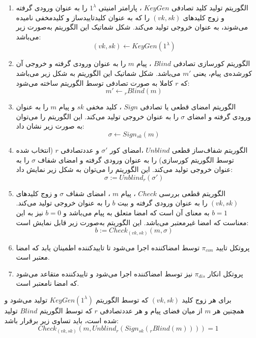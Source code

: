 \documentclass[12pt,a4paper]{article}
\theoremstyle{plain}
\theoremstyle{definition}
\theoremstyle{remark}
\begin{document}
\begin{enumerate}
	\item 
الگوریتم تولید کلید تصادفی 
$KeyGen$
، پارامتر امنیتی
$1^\lambda$
را به عنوان ورودی گرفته و زوج کلیدهای
$(vk,sk)$
را که به عنوان کلیدتاییدساز و کلید‌مخفی نامیده می‌شوند، به عنوان خروجی تولید می‌کند. شکل شماتیک این الگوریتم به‌صورت زیر می‌باشد:
$$ (vk,sk) \longleftarrow KeyGen(1^{\lambda}) $$

\item 
الگوریتم کورسازی تصادفی
$Blind$
، پیام 
$m$
را به عنوان ورودی گرفته و خروجی آن کورشده‌ی پیام، یعنی
$m'$
می‌باشد. شکل شماتیک این الگوریتم به شکل زیر می‌باشد که 
$r$
کاملا به صورت تصادفی توسط الگوریتم ساخته
می‌شود:
$$ m' \longleftarrow {_{r}Blind(m)} $$

\item
الگوریتم امضای قطعی یا تصادفی 
$Sign$
، کلید مخفی
$sk$
و پیام
$m$
را به عنوان ورودی گرفته و امضای
$\sigma$
را به عنوان خروجی تولید می‌کند. این الگوریتم را می‌توان به صورت زیر نشان داد:
$$ \sigma \longleftarrow Sign_{sk}(m) $$

\item 
الگوریتم شفاف‌ساز قطعی 
$Unblind$
،امضای کور
$\sigma'$
و عددتصادفی 
$r$
(انتخاب شده توسط الگوریتم کورسازی) را به عنوان ورودی گرفته و امضای شفاف
$\sigma$
را به عنوان خروجی تولید می‌کند. این الگوریتم را می‌توان به شکل زیر نمایش داد:
$$ \sigma := Unblind_r(\sigma') $$

\item 
الگوریتم قطعی بررسی 
$Check$
، پیام 
$m$
، امضای شفاف
$\sigma$
و زوج کلیدهای
$(vk,sk)$
را به عنوان ورودی گرفته و بیت 
$b$
را به عنوان خروجی تولید می‌کند.
$b=1$
به معنای آن است که امضا متعلق به پیام می‌باشد و 
$b=0$
نیز به این معناست که امضا غیرمعتبر می‌باشد. این الگوریتم به‌صورت زیر قابل نمایش است:
$$ b := Check_{(vk,sk)}(m,\sigma) $$

\item
پروتکل تایید
$\pi_{con}$
توسط امضاکننده اجرا می‌شود تا تاییدکننده اطمینان یابد که امضا معتبر است.

\item 
پروتکل انکار
$\pi_{dis}$
نیز توسط امضاکننده اجرا می‌شود و تاییدکننده متقاعد می‌شود که امضا نامعتبر است.
\end{enumerate}

برای هر زوج کلید 
$(vk,sk)$
که توسط الگوریتم 
$KeyGen(1^{\lambda})$
تولید می‌شود و همچنین هر
$m$
از میان فضای پیام و هر عددتصادفی
$r$
که توسط الگوریتم 
$Blind$
تولید شده است، باید تساوی زیر برقرار باشد:
$$ Check_{(vk,sk)}(m,Unblind_r(Sign_{sk}(_{r}Blind(m)))) = 1 $$
\end{document}
